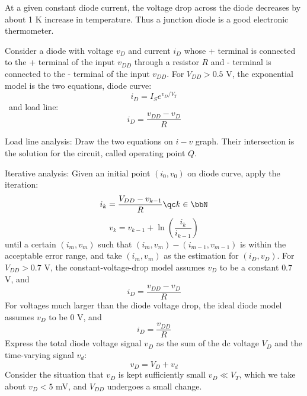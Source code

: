 \documentclass[a4paper,12pt]{report}
\begin{document}
At a given constant diode current, the voltage drop across the diode decreases by about 1 K increase in temperature. Thus a junction diode is a good electronic thermometer.

Consider a diode with voltage $v_D$ and current $i_D$ whose + terminal is connected to the + terminal of the input $v_{DD}$ through a resistor $R$ and - terminal is connected to the - terminal of the input $v_{DD}$.
For $V_{DD}>0.5$ V, the exponential model is the two equations, diode curve:
\[i_D=I_Se^{v_D/V_T}\]\
and load line:
\[i_D=\frac{v_{DD}-v_D}{R}\]
\bit
\item Load line analysis: Draw the two equations on $i-v$ graph. Their intersection is the solution for the circuit, called operating point $Q$.
\item Iterative analysis: Given an initial point $(i_0,v_0)$ on diode curve, apply the iteration:
  \[i_k=\frac{V_{DD}-v_{k-1}}{R}\qc k\in\bbN\]
  \[v_k=v_{k-1}+\ln(\frac{i_k}{i_{k-1}})\]
  until a certain $(i_m,v_m)$ such that $(i_m,v_m)-(i_{m-1},v_{m-1})$ is within the acceptable error range, and take $(i_m,v_m)$ as the estimation for $(i_D,v_D)$.
\eit
{}
For $V_{DD}>0.7$ V, the constant-voltage-drop model assumes $v_D$ to be a constant $0.7$ V, and
\[i_D=\frac{v_{DD}-v_D}{R}\]
For voltages much larger than the diode voltage drop, the ideal diode model assumes $v_D$ to be $0$ V, and
\[i_D=\frac{v_{DD}}{R}\]
Express the total diode voltage signal $v_D$ as the sum of the dc voltage $V_D$ and the time-varying signal $v_d$:
\[v_D=V_D+v_d\]
Consider the situation that $v_D$ is kept sufficiently small $v_D\ll V_T$, which we take about $v_D<5$ mV, and $V_{DD}$ undergoes a small change.
\end{document}
